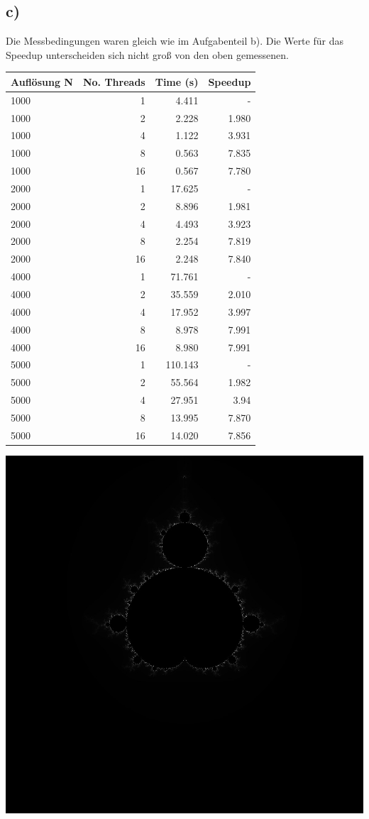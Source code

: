 \documentclass{article}
\begin{document}
	\newpage
        \subsection{c)}
        
        Die Messbedingungen waren gleich wie im Aufgabenteil b). Die Werte für das Speedup unterscheiden sich nicht groß von den oben gemessenen.\\
        
        \begin{tabular}{|l|r|r|r|}
        	\hline
        	 Auflösung N & No. Threads &  Time (s) & Speedup \\
        	 	\hline
        	 1000& 1 &  4.411 & - \\
        	 1000& 2 &  2.228 & 1.980 \\
        	 1000& 4 &  1.122 & 3.931 \\
        	 1000& 8 &  0.563 & 7.835\\
        	 1000& 16 &  0.567 & 7.780 \\
        	\hline
        	2000& 1 & 17.625 & - \\
        	2000& 2 &  8.896& 1.981 \\
        	2000& 4 &  4.493& 3.923 \\
        	2000& 8 &  2.254& 7.819 \\
        	2000& 16 &  2.248& 7.840 \\
        	\hline
        	4000& 1 & 71.761 & - \\
        	4000& 2 &  35.559 & 2.010 \\
        	4000& 4 &  17.952& 3.997 \\
        	4000& 8 &  8.978 & 7.991\\
        	4000& 16 &  8.980 & 7.991 \\
        	\hline
        	5000& 1 &  110.143 & - \\
        	5000& 2 &  55.564 & 1.982 \\
        	5000& 4 &  27.951 & 3.94 \\
        	5000& 8 &  13.995 & 7.870 \\
        	5000& 16 &  14.020 & 7.856\\
        	\hline
        \end{tabular}
	\begin{center}
		\includegraphics[width=0.6\linewidth]{Aufgaben-Ressourcen/normal-1000.jpg}	
	\end{center}
\end{document}
